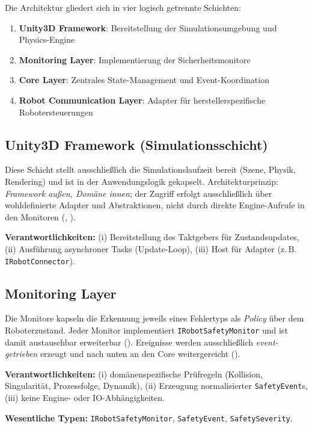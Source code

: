 Die Architektur gliedert sich in vier logisch getrennte Schichten:

\begin{enumerate}
	\item \textbf{Unity3D Framework}: Bereitstellung der Simulationsumgebung und Physics-Engine
	\item \textbf{Monitoring Layer}: Implementierung der Sicherheitsmonitore
	\item \textbf{Core Layer}: Zentrales State-Management und Event-Koordination
	\item \textbf{Robot Communication Layer}: Adapter für herstellerspezifische Robotersteuerungen
\end{enumerate}


\subsection{Unity3D Framework (Simulationsschicht)}
Diese Schicht stellt ausschließlich die Simulationslaufzeit bereit (Szene, Physik, Rendering) und ist in der Anwendungslogik gekapselt. Architekturprinzip: \emph{Framework außen, Domäne innen}; der Zugriff erfolgt ausschließlich über wohldefinierte Adapter und Abstraktionen, nicht durch direkte Engine-Aufrufe in den Monitoren (, ).

\textbf{Verantwortlichkeiten:}
(i) Bereitstellung des Taktgebers für Zustandsupdates,
(ii) Ausführung asynchroner Tasks (Update-Loop),
(iii) Host für Adapter (z.\,B. \texttt{IRobotConnector}).

\subsection{Monitoring Layer}
Die Monitore kapseln die Erkennung jeweils eines Fehlertyps als \emph{Policy} über dem Roboterzustand. Jeder Monitor implementiert \texttt{IRobotSafetyMonitor} und ist damit austauschbar erweiterbar (). Ereignisse werden ausschließlich \emph{event-getrieben} erzeugt und nach unten an den Core weitergereicht ().

\textbf{Verantwortlichkeiten:}
(i) domänenspezifische Prüfregeln (Kollision, Singularität, Prozessfolge, Dynamik),
(ii) Erzeugung normalisierter \texttt{SafetyEvent}s,
(iii) keine Engine- oder IO-Abhängigkeiten.

\textbf{Wesentliche Typen:}
\texttt{IRobotSafetyMonitor}, \texttt{SafetyEvent}, \texttt{SafetySeverity}.

